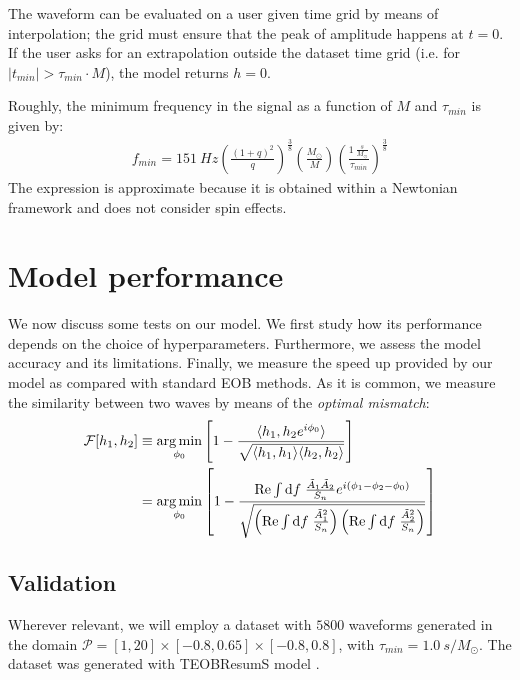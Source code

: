 The waveform can be evaluated on a user given time grid by means of interpolation; the grid must ensure that the peak of amplitude happens at $t=0$.
If the user asks for an extrapolation outside the dataset time grid (i.e. for $|t_{min}| > \tau_{min} \cdot M$), the model returns $h = 0$.
\par
Roughly, the minimum frequency in the signal as a function of $M$ and $\tau_{min}$ is given by:
\begin{align}\label{eq:f_min}
	f_{min} =
	\SI{151}{Hz}  \left( \frac{(1+q)^2}{q} \right)^{\frac{3}{8}}  \left( \frac{M_\odot}{M} \right)  \left(\frac{\SI{1}{ \frac{s}{M_\odot}}}{\tau_{min}} \right)^{\frac{3}{8}}  
\end{align} 
The expression is approximate because it is obtained within a Newtonian framework and does not consider spin effects.
\par

\section{Model performance}
We now discuss some tests on our model. We first study how its performance depends on the choice of hyperparameters. Furthermore, we assess the model accuracy and its limitations.
Finally, we measure the speed up provided by our model as compared with standard EOB methods.
As it is common, we measure the similarity between two waves by means of the \textit{optimal mismatch}:
\begin{align}
	\mathcal{F}[h_1,h_2] &\equiv \operatorname*{arg\,min}_{\phi_0} \left[ 1- \frac{\langle h_1, h_2 e^{i\phi_0} \rangle}{\sqrt{\langle h_1, h_1 \rangle \langle h_2, h_2 \rangle}} \right]	\label{eq:mismatch_def} \\
	& = \operatorname*{arg\,min}_{\phi_0} \left[ 1- \frac{ \mathrm{Re} \int \operatorname{d}\!{f} \; \frac{\tilde{A}_1 \tilde{A}_2}{S_n} e^{i(\phi_1-\phi_2-\phi_0)}}
		{\sqrt{\left(\mathrm{Re} \int \operatorname{d}\!{f} \; \frac{\tilde{A}_1^2}{S_n}\right)
		\left( \mathrm{Re} \int \operatorname{d}\!{f} \; \frac{\tilde{A}_2^2}{S_n} \right)}} \right] \nonumber
\end{align}
\subsection{Validation}
Wherever relevant, we will employ a dataset with $5800$ waveforms generated in the domain $\mathcal{P} = [1,20]\times[-0.8,0.65]\times[-0.8,0.8]$, with $\tau_{min} = \SI{1.0}{s/M_\odot}$. The dataset was generated with TEOBResumS model \cite{}.
